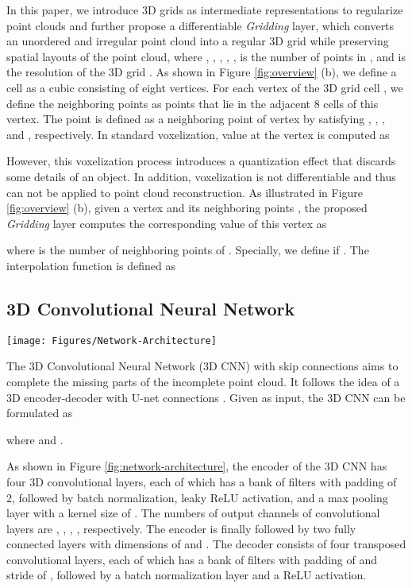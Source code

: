 \documentclass[runningheads]{llncs}
\begin{document}
In this paper, we introduce 3D grids as intermediate representations to regularize point clouds and further propose a differentiable {\it Gridding} layer, which converts an unordered and irregular point cloud  into a regular 3D grid  while preserving spatial layouts of the point cloud, where , , , , ,  is the number of points in , and  is the resolution of the 3D grid .
As shown in Figure \ref{fig:overview} (b), we define a cell as a cubic consisting of eight vertices.
For each vertex  of the 3D grid cell , we define the neighboring points  as points that lie in the adjacent 8 cells of this vertex.
The point  is defined as a neighboring point of vertex  by satisfying , , , and , respectively.
In standard voxelization, value  at the vertex  is computed as

However, this voxelization process introduces a quantization effect that discards some details of an object.
In addition, voxelization is not differentiable and thus can not be applied to point cloud reconstruction.
As illustrated in Figure \ref{fig:overview} (b), given a vertex  and its neighboring points , the proposed {\it Gridding} layer computes the corresponding value  of this vertex  as

where  is the number of neighboring points of .
Specially, we define  if .
The interpolation function  is defined as


\subsection{3D Convolutional Neural Network}
\label{sec:3dcnn}

\begin{figure*}[!t]
  \resizebox{\linewidth}{!} {
    \texttt{[image: Figures/Network-Architecture]}
  }
  \caption{The network architecture of GRNet.  denotes the sum operation. Tile creates a new tensor of size  by replicating the ``Coarse Point Cloud'' 8 times.}
  \label{fig:network-architecture}
\end{figure*}

The 3D Convolutional Neural Network (3D CNN) with skip connections aims to complete the missing parts of the incomplete point cloud.
It follows the idea of a 3D encoder-decoder with U-net connections \cite{DBLP:conf/iccv/XieHXSS19,DBLP:journals/ijcv/XieHSSW20}.
Given  as input, the 3D CNN can be formulated as

where  and .

As shown in Figure \ref{fig:network-architecture}, the encoder of the 3D CNN has four 3D convolutional layers, each of which has a bank of  filters with padding of 2, followed by batch normalization, leaky ReLU activation, and a max pooling layer with a kernel size of .
The numbers of output channels of convolutional layers are , , , , respectively.
The encoder is finally followed by two fully connected layers with dimensions of  and .
The decoder consists of four transposed convolutional layers, each of which has a bank of  filters with padding of  and stride of , followed by a batch normalization layer and a ReLU activation.
\end{document}
